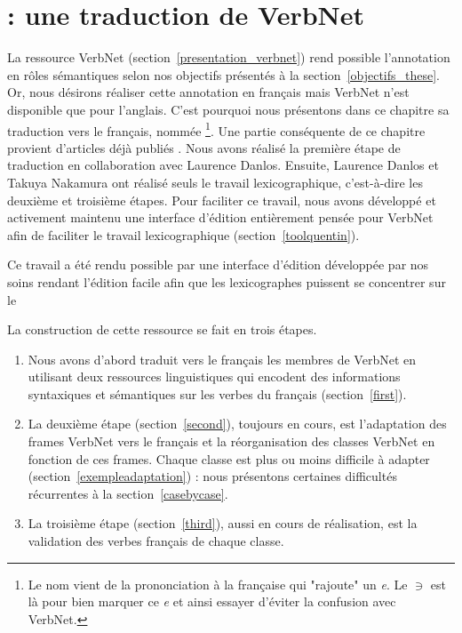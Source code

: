\chapter{\verbenet{} : une traduction de VerbNet}
\label{ch:verbnet}

La ressource VerbNet (section~\ref{presentation_verbnet}) rend possible
l'annotation en rôles sémantiques selon nos objectifs présentés à la
section~\ref{objectifs_these}. Or, nous désirons réaliser cette annotation en
français mais VerbNet n'est disponible que pour l'anglais. C'est pourquoi nous
présentons dans ce chapitre sa traduction vers le français, nommée
\verbenet{}\footnote{Le nom vient de la prononciation à la française qui
    "rajoute" un \textit{e}. Le $\ni$ est là pour bien marquer ce \textit{e} et
ainsi essayer d'éviter la confusion avec VerbNet.}. Une partie conséquente de
ce chapitre provient d'articles déjà publiés
\citep{danlos2014vers,pradet2014adapting}. Nous avons réalisé la première étape
de traduction en collaboration avec Laurence Danlos. Ensuite, Laurence Danlos
et Takuya Nakamura ont réalisé seuls le travail lexicographique, c'est-à-dire
les deuxième et troisième étapes. Pour faciliter ce travail, nous avons
développé et activement maintenu une interface d'édition entièrement pensée
pour VerbNet afin de faciliter le travail lexicographique
(section~\ref{toolquentin}).

Ce travail a été rendu possible par une interface
d'édition développée par nos soins rendant l'édition facile afin que les
lexicographes puissent se concentrer sur le 

La construction de cette ressource se fait en trois étapes.
\begin{enumerate}
    \item Nous avons d'abord traduit vers le français les membres de VerbNet en
        utilisant deux ressources linguistiques qui encodent des informations
        syntaxiques et sémantiques sur les verbes du français
        (section~\ref{first}).
    \item La deuxième étape (section~\ref{second}), toujours en cours, est
        l'adaptation des frames VerbNet vers le français et la réorganisation
        des classes VerbNet en fonction de ces frames. Chaque classe est plus
        ou moins difficile à adapter (section~\ref{exempleadaptation}) : nous
        présentons certaines difficultés récurrentes à la
        section~\ref{casebycase}.
    \item La troisième étape (section~\ref{third}), aussi en cours de
        réalisation, est la validation des verbes français de chaque classe.
\end{enumerate}

